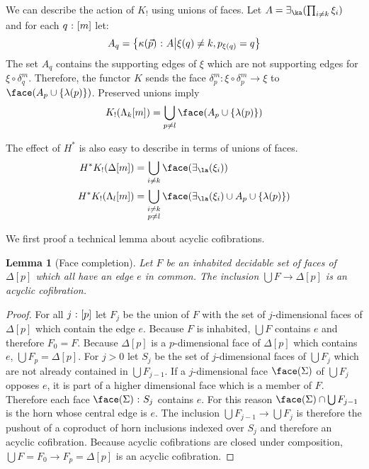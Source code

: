 \documentclass{amsart}
\theoremstyle{plain}
\newtheorem{lemma}[theorem]{Lemma}
\theoremstyle{definition}
\newcommand\set[1]{\left\{#1\right\}}
\newcommand\ri{^*}
\begin{document}
We can describe the action of $K_!$ using unions of faces. Let $A = \im\ka(\prod_{i\neq k}\xi_i)$ and for each $q\mathord{\ :\ }[m]$ let:
\[ A_q = \set{\kappa(\vec p)\of A\middle|\xi(q) \neq k, p_{\xi(q)}=q } \]
The set $A_q$ contains the supporting edges of $\xi$ which are not supporting edges for $\xi\circ\delta^m_q$. Therefore, the functor $K$ sends the face $\delta^m_p:\xi\circ\delta^m_p \to \xi$ to $\face(A_p\cup\set{\lambda(p)})$. Preserved unions imply
\[ K_!(\Lambda_k[m]) = \bigcup_{p\neq l} \face(A_p\cup\set{\lambda(p)})\]

The effect of $H\ri$ is also easy to describe in terms of unions of faces.
\begin{align*}
H\ri K_!(\Delta[m]) &= \bigcup_{i\neq k} \face(\im\la(\xi_i)) \\
H\ri K_!(\Lambda_l[m]) &= \bigcup_{\substack{i\neq k\\p\neq l}} \face(\im\la(\xi_i)\cup A_p\cup\set{\lambda(p)})
\end{align*}

We first proof a technical lemma about acyclic cofibrations.

\begin{lemma}[Face completion] Let $F$ be an inhabited decidable set of faces of $\Delta[p]$ which all have an edge $e$ in common. The inclusion $\bigcup F\to \Delta[p]$ is an acyclic cofibration. \label{facecom} \end{lemma}

\begin{proof} For all $j\mathord{\ :\ }[p]$ let $F_j$ be the union of $F$ with the set of $j$-dimensional faces of $\Delta[p]$ which contain the edge $e$. Because $F$ is inhabited, $\bigcup F$ contains $e$ and therefore $F_0=F$. Because $\Delta[p]$ is a $p$-dimensional face of $\Delta[p]$ which contains $e$, $\bigcup F_p = \Delta[p]$. For $j>0$ let $S_j$ be the set of $j$-dimensional faces of $\bigcup F_j$ which are not already contained in $\bigcup F_{j-1}$. If a $j$-dimensional face $\face(\Sigma)$ of $\bigcup F_j$ opposes $e$, it is part of a higher dimensional face which is a member of $F$. Therefore each face $\face(\Sigma)\of S_j$ contains $e$. For this reason $\face(\Sigma)\cap \bigcup F_{j-1}$ is the horn whose central edge is $e$. The inclusion $\bigcup F_{j-1}\to\bigcup F_j$ is therefore the pushout of a coproduct of horn inclusions indexed over $S_j$ and therefore an acyclic cofibration. Because acyclic cofibrations are closed under composition, $\bigcup F = F_0\to F_p = \Delta[p]$ is an acyclic cofibration. 
\end{proof}
\end{document}
